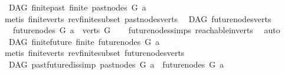 \begin{isabellebody}
%
\isadelimproof
\isanewline
%
\endisadelimproof
\isanewline
{}\isamarkupfalse%
\ {\isacharparenleft}{\kern0pt}\ DAG{\isacharparenright}{\kern0pt}\ finite{\isacharunderscore}{\kern0pt}past{\isacharcolon}{\kern0pt}\ {\isachardoublequoteopen}finite\ {\isacharparenleft}{\kern0pt}past{\isacharunderscore}{\kern0pt}nodes\ G\ a{\isacharparenright}{\kern0pt}{\isachardoublequoteclose}\isanewline
%
\isadelimproof
\ \ %
\endisadelimproof
%
\isatagproof
{}\isamarkupfalse%
\ {\isacharparenleft}{\kern0pt}metis\ finite{\isacharunderscore}{\kern0pt}verts\ rev{\isacharunderscore}{\kern0pt}finite{\isacharunderscore}{\kern0pt}subset\ past{\isacharunderscore}{\kern0pt}nodes{\isacharunderscore}{\kern0pt}verts{\isacharparenright}{\kern0pt}%
\endisatagproof
{\isafoldproof}%
%
\isadelimproof
\isanewline
%
\endisadelimproof
\isanewline
{}\isamarkupfalse%
\ {\isacharparenleft}{\kern0pt}\ DAG{\isacharparenright}{\kern0pt}\ future{\isacharunderscore}{\kern0pt}nodes{\isacharunderscore}{\kern0pt}verts{\isacharcolon}{\kern0pt}\ \isanewline
\ \ \ {\isachardoublequoteopen}future{\isacharunderscore}{\kern0pt}nodes\ G\ a\ {\isasymsubseteq}\ verts\ G{\isachardoublequoteclose}\isanewline
%
\isadelimproof
\ \ %
\endisadelimproof
%
\isatagproof
{}\isamarkupfalse%
\ future{\isacharunderscore}{\kern0pt}nodes{\isachardot}{\kern0pt}simps\ reachable{}{\isacharunderscore}{\kern0pt}in{\isacharunderscore}{\kern0pt}verts\ \isamarkupfalse%
\ auto%
\endisatagproof
{\isafoldproof}%
%
\isadelimproof
\isanewline
%
\endisadelimproof
\isanewline
{}\isamarkupfalse%
\ {\isacharparenleft}{\kern0pt}\ DAG{\isacharparenright}{\kern0pt}\ finite{\isacharunderscore}{\kern0pt}future{\isacharcolon}{\kern0pt}\ {\isachardoublequoteopen}finite\ {\isacharparenleft}{\kern0pt}future{\isacharunderscore}{\kern0pt}nodes\ G\ a{\isacharparenright}{\kern0pt}{\isachardoublequoteclose}\isanewline
%
\isadelimproof
\ \ %
\endisadelimproof
%
\isatagproof
{}\isamarkupfalse%
\ {\isacharparenleft}{\kern0pt}metis\ finite{\isacharunderscore}{\kern0pt}verts\ rev{\isacharunderscore}{\kern0pt}finite{\isacharunderscore}{\kern0pt}subset\ future{\isacharunderscore}{\kern0pt}nodes{\isacharunderscore}{\kern0pt}verts{\isacharparenright}{\kern0pt}%
\endisatagproof
{\isafoldproof}%
%
\isadelimproof
\isanewline
%
\endisadelimproof
\isanewline
{}\isamarkupfalse%
\ {\isacharparenleft}{\kern0pt}\ DAG{\isacharparenright}{\kern0pt}\ past{\isacharunderscore}{\kern0pt}future{\isacharunderscore}{\kern0pt}dis{\isacharbrackleft}{\kern0pt}simp{\isacharbrackright}{\kern0pt}{\isacharcolon}{\kern0pt}\ {\isachardoublequoteopen}past{\isacharunderscore}{\kern0pt}nodes\ G\ a\ {\isasyminter}\ future{\isacharunderscore}{\kern0pt}nodes\ G\ a\ {\isacharequal}{\kern0pt}\ {\isacharbraceleft}{\kern0pt}{\isacharbraceright}{\kern0pt}{\isachardoublequoteclose}\isanewline

\end{isabellebody}
